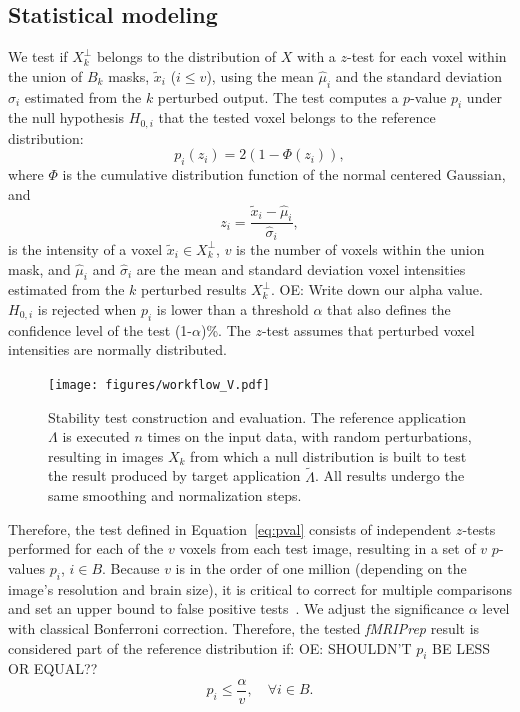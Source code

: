 \documentclass[lettersize,journal]{IEEEtran}
\newcommand{\oesteban}[1]{\color{orange}\textsc{OE:} #1\color{black}\xspace}
\newcommand{\fmriprep}{\emph{fMRIPrep}\xspace}
\begin{document}
\subsection{Statistical modeling}
We test if $X_k^\perp$ belongs to the distribution of $X$ with a $z$-test for each voxel within the
  union of $B_k$ masks, $\tilde x_i$ ($i\leq v$),
  using the mean $\hat \mu_i$ and the standard deviation $\hat \sigma_i$ estimated from the $k$ perturbed output.
The test computes a $p$-value $p_i$ under the null hypothesis $H_{0,i}$ that the tested voxel belongs
  to the reference distribution:
\begin{equation} \label{eq:pval}
    p_i(z_i) = 2 \left(1-\Phi(z_i)\right),
\end{equation}
where $\Phi$ is the cumulative distribution function of the normal centered Gaussian, and
\begin{equation*}
    z_i = \frac{\tilde x_i-\hat \mu_i}{\hat \sigma_i},
\end{equation*}
  is the intensity of a voxel $\tilde x_i \in X_k^\perp$, $v$ is the number of voxels within the union mask, 
  and $\hat \mu_i$ and $\hat \sigma_i$ are the mean and standard deviation voxel intensities estimated
  from the $k$ perturbed results $X_k^\perp$.
\oesteban{Write down our alpha value.}
$H_{0,i}$ is rejected when $p_i$ is lower than a threshold $\alpha$ that also defines the confidence level of the test (1-$\alpha$)\%.
The $z$-test assumes that perturbed voxel intensities are normally distributed.
\begin{figure}
    \centering
    \texttt{[image: figures/workflow\_V.pdf]}
    \caption{Stability test construction and evaluation. The reference application $\Lambda$ is executed $n$ times on the input data, with random perturbations, resulting in images $X_k$ from which a null distribution is built to test the result produced by target application $\tilde \Lambda$. All results undergo the same smoothing and normalization steps.}
    \label{fig:test_workflow}
\end{figure}

Therefore, the test defined in Equation~\ref{eq:pval} consists of independent $z$-tests performed for each of the $v$ voxels
  from each test image, resulting in a set of $v$ $p$-values $p_i$, $i \in B$.
Because $v$ is in the order of one million (depending on the image's resolution and brain size), it is critical
  to correct for multiple comparisons and set an upper bound to false positive tests~\cite{NICHOLS2007246}.
We adjust the significance $\alpha$ level with classical Bonferroni correction.
Therefore, the tested \fmriprep result is considered part of the reference distribution if:
\oesteban{SHOULDN'T $p_i$ BE LESS OR EQUAL??}
\begin{equation}
    \label{eq:bonferroni}
    p_i \leq \frac{\alpha}{v}, \quad \forall i \in B.
\end{equation}
\end{document}
